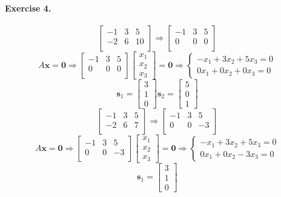 \documentclass{article}
\begin{document}
\paragraph{Exercise 4.}
  \[
  \begin{bmatrix}
    -1 & 3 & 5\\
    -2 & 6 & 10\\
  \end{bmatrix} \Rightarrow
  \begin{bmatrix}
    -1 & 3 & 5\\
    0 & 0 & 0\\
  \end{bmatrix} 
  \]
  \[
  A\mathbf{x}=\mathbf{0} \Rightarrow \begin{bmatrix}
    -1 & 3 & 5\\
    0 & 0 & 0\\
  \end{bmatrix} \begin{bmatrix}
    x_1\\x_2\\x_3
  \end{bmatrix} = \mathbf{0}
  \Rightarrow
  \left\{
  \begin{aligned}
    -x_1+3x_2+5x_3=0\\
    0x_1+0x_2+0x_3=0
  \end{aligned}
  \right.
  \]
  \[
  \mathbf{s}_1=\begin{bmatrix}
    3 \\ 1 \\ 0
  \end{bmatrix}
  \mathbf{s}_2 = \begin{bmatrix}
    5 \\ 0 \\ 1
  \end{bmatrix}
  \]
\[
  \begin{bmatrix}
    -1 & 3 & 5\\
    -2 & 6 & 7\\
  \end{bmatrix} \Rightarrow
  \begin{bmatrix}
    -1 & 3 & 5\\
    0 & 0 & -3\\
  \end{bmatrix} 
  \]
  \[
  A\mathbf{x}=\mathbf{0} \Rightarrow \begin{bmatrix}
    -1 & 3 & 5\\
    0 & 0 & -3\\
  \end{bmatrix} \begin{bmatrix}
    x_1\\x_2\\x_3
  \end{bmatrix} = \mathbf{0}
  \Rightarrow
  \left\{
  \begin{aligned}
    -x_1+3x_2+5x_3=0\\
    0x_1+0x_2-3x_3=0
  \end{aligned}
  \right.
  \]
  \[
  \mathbf{s}_1=\begin{bmatrix}
    3 \\ 1 \\ 0
  \end{bmatrix}
  \]
\end{document}
